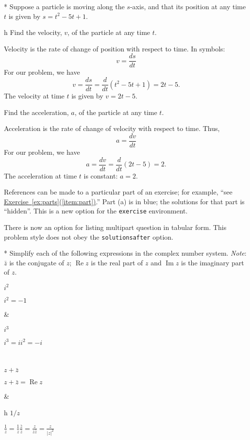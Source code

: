 \documentclass{article}
\begin{document}
\begin{exercise}*\label{ex:parts}
Suppose a particle is moving along the $s$-axis, and that its position
at any time $t$ is given by $s=t^2 - 5t + 1$.
\begin{parts}
\item[h]\label{item:part} Find the velocity, $v$, of the particle at any time
$t$.
\begin{solution}
Velocity is the rate of change of position with respect to time. In
symbols:
$$
                    v = \frac{ds}{dt}
$$
For our problem, we have
$$
        v = \frac{ds}{dt} =\frac d{dt}(t^2 - 5t + 1) = 2t-5.
$$
The velocity at time $t$ is given by $\boxed{v=2t-5}$.
\end{solution}

\item Find the acceleration, $a$, of the particle at any time $t$.
\begin{solution}
Acceleration is the rate of change of velocity with respect to time.
Thus,
$$
                    a = \frac{dv}{dt}
$$
For our problem, we have
$$
        a = \frac{dv}{dt} =\frac d{dt}(2t-5)=2.
$$
The acceleration at time $t$ is constant: $\boxed{a=2}$.
\end{solution}
\end{parts}
\end{exercise}

References can be made to a particular part of an exercise; for example,
``see \hyperref[item:part]{Exercise~\ref*{ex:parts}(\ref*{item:part})}.''
Part (a) is in \textcolor{webblue}{blue}; the solutions for that part is
``hidden''.  This is a new option for the \texttt{exercise} environment.

There is now an option for listing multipart question in tabular form.
This problem style does not obey the \texttt{solutions\-after} option.

\begin{exercise}*
Simplify each of the following expressions in the complex number
system. \textit{Note}: $\bar z$ is the conjugate of $z$;
$\operatorname{Re} z$ is the real part of $z$ and
$\operatorname{Im} z$ is the imaginary part of $z$.
\begin{parts}[2]
\item $i^2$
\begin{solution} $i^2 = -1$ \end{solution}
&
\item $i^3$ \begin{solution} $i^3 = i i^2 = -i$\end{solution}
\\
\item $z+\bar z$
\begin{solution} $z+\bar z=\operatorname{Re} z$\end{solution}
&
\item[h] $1/z$
\begin{solution}
$\displaystyle\frac 1z=\frac 1z\frac{\bar z}{\bar z}=\frac z{z\bar z}=\frac z{|z|^2}$
\end{solution}
\end{parts}
\end{exercise}
\end{document}
